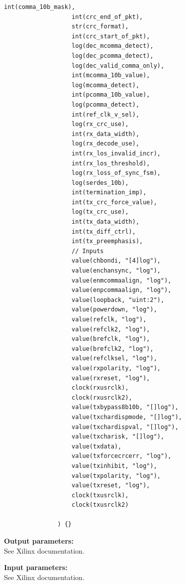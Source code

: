 \begin{lstlisting}[gobble=12, language=threepl]
                   int(comma_10b_mask),
                   int(crc_end_of_pkt),
                   str(crc_format),
                   int(crc_start_of_pkt),
                   log(dec_mcomma_detect),
                   log(dec_pcomma_detect),
                   log(dec_valid_comma_only),
                   int(mcomma_10b_value),
                   log(mcomma_detect),
                   int(pcomma_10b_value),
                   log(pcomma_detect),
                   int(ref_clk_v_sel),
                   log(rx_crc_use),
                   int(rx_data_width),
                   log(rx_decode_use),
                   int(rx_los_invalid_incr),
                   int(rx_los_threshold),
                   log(rx_loss_of_sync_fsm),
                   log(serdes_10b),
                   int(termination_imp),
                   int(tx_crc_force_value),
                   log(tx_crc_use),
                   int(tx_data_width),
                   int(tx_diff_ctrl),
                   int(tx_preemphasis),
                   // Inputs
                   value(chbondi, "[4]log"),
                   value(enchansync, "log"),
                   value(enmcommaalign, "log"),
                   value(enpcommaalign, "log"),
                   value(loopback, "uint:2"),
                   value(powerdown, "log"),
                   value(refclk, "log"),
                   value(refclk2, "log"),
                   value(brefclk, "log"),
                   value(brefclk2, "log"),
                   value(refclksel, "log"),
                   value(rxpolarity, "log"),
                   value(rxreset, "log"),
                   clock(rxusrclk),
                   clock(rxusrclk2),
                   value(txbypass8b10b, "[]log"),
                   value(txchardispmode, "[]log"),
                   value(txchardispval, "[]log"),
                   value(txcharisk, "[]log"),
                   value(txdata),
                   value(txforcecrcerr, "log"),
                   value(txinhibit, "log"),
                   value(txpolarity, "log"),
                   value(txreset, "log"),
                   clock(txusrclk),
                   clock(txusrclk2)

               ) {}
            \end{lstlisting}

            {\bf Output parameters:} \\
            See Xilinx documentation.

            {\bf Input parameters:} \\
            See Xilinx documentation.

